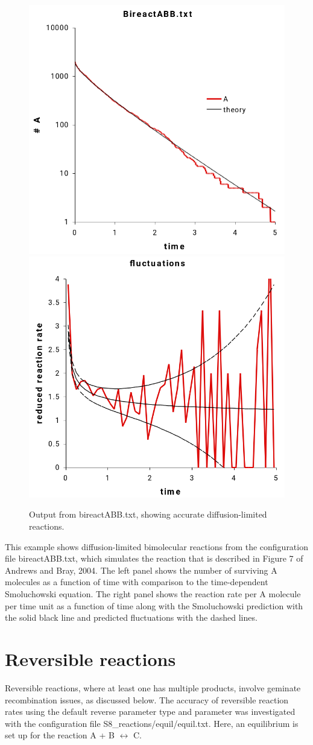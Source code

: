 \documentclass {scrbook}
\begin{document}
\begin{figure}[h]
\centering
\includegraphics[height=5 cm]{figures/image41.png}
\includegraphics[height=5 cm]{figures/image42.png}
\caption{Output from bireactABB.txt, showing accurate diffusion-limited reactions.}
\label{fig:bireactABB}
\end{figure}

This example shows diffusion-limited bimolecular reactions from the configuration file bireactABB.txt, which simulates the reaction that is described in Figure 7 of Andrews and Bray, 2004. The left panel shows the number of surviving A molecules as a function of time with comparison to the time-dependent Smoluchowski equation. The right panel shows the reaction rate per A molecule per time unit as a function of time along with the Smoluchowski prediction with the solid black line and predicted fluctuations with the dashed lines.

\section{Reversible reactions}

Reversible reactions, where at least one has multiple products, involve geminate recombination issues, as discussed below. The accuracy of reversible reaction rates using the default reverse parameter type and parameter was investigated with the configuration file S8\_reactions/equil/equil.txt. Here, an equilibrium is set up for the reaction A + B $\leftrightarrow$ C.
\end{document}
